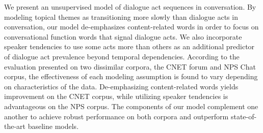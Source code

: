 We present an unsupervised model of dialogue act sequences in conversation. By modeling topical themes as transitioning more slowly than dialogue acts in conversation, our model de-emphasizes content-related words in order to focus on conversational function words that signal dialogue acts. We also incorporate speaker tendencies to use some acts more than others as an additional predictor of dialogue act prevalence beyond temporal dependencies. According to the evaluation presented on two dissimilar corpora, the CNET forum and NPS Chat corpus, the effectiveness of each modeling assumption is found to vary depending on characteristics of the data. De-emphasizing content-related words yields improvement on the CNET corpus, while utilizing speaker tendencies is advantageous on the NPS corpus. The components of our model complement one another to achieve robust performance on both corpora and outperform state-of-the-art baseline models.
